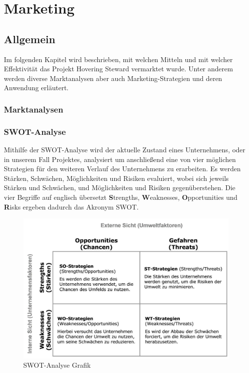 \chapter{Marketing}
\renewcommand{\kapitelautor}{Autor: Markus Kaiser}

\section{Allgemein}
Im folgenden Kapitel wird beschrieben, mit welchen Mitteln und mit welcher Effektivität
das Projekt Hovering Steward vermarktet wurde. Unter anderem werden diverse Marktanalysen
aber auch Marketing-Strategien und deren Anwendung erläutert.

  \subsection{Marktanalysen}
    \subsection*{SWOT-Analyse}
    Mithilfe der SWOT-Analyse wird der aktuelle Zustand eines Unternehmens, oder in unserem Fall Projektes, analysiert um anschließend eine von vier möglichen Strategien
    für den weiteren Verlauf des Unternehmens zu erarbeiten. Es werden Stärken, Schwächen, Möglichkeiten und Risiken evaluiert, wobei sich jeweils Stärken und Schwächen, und
    Möglichkeiten und Risiken gegenüberstehen. Die vier Begriffe auf englisch übersetzt \textbf{S}trengths, \textbf{W}eaknesses, \textbf{O}pportunities und \textbf{R}isks
    ergeben dadurch das Akronym SWOT.

    \begin{figure}[H]
      \begin{centering}
      \includegraphics[width = 1\textwidth]{Bilder/swot.jpg}
      \par\end{centering}
      \caption[SWOT-Analyse Grafik]{SWOT-Analyse Grafik\cite{pic_swot}}
      \label{swot}
    \end{figure}

